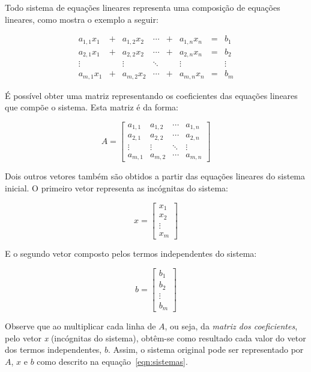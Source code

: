 \documentclass[a4paper,10pt]{report}
\begin{document}
Todo sistema de equações lineares representa uma composição de equações lineares, como mostra o exemplo a seguir:

\[
\begin{array}{cccccccc}
a_{1,1}x_{1} & + & a_{1,2}x_{2} & \cdots & + & a_{1,n}x_{n} & = & b_{1}\\
a_{2,1}x_{1} & + & a_{2,2}x_{2} & \cdots & + & a_{2,n}x_{n} & = & b_{2}\\
\vdots  & & \vdots  &  \ddots & & \vdots &  & \vdots  \\
a_{m,1}x_{1} & + & a_{m,2}x_{2} & \cdots & + & a_{m,n}x_{n} & = & b_{m}
\label{arr:sistema}
\end{array}
\]

É possível obter uma matriz representando os coeficientes das equações lineares que compõe o sistema. Esta matriz é da forma:

\[
A = \left[ \begin{array}{cccc}
a_{1,1} & a_{1,2} & \cdots & a_{1,n} \\
a_{2,1} & a_{2,2} & \cdots & a_{2,n} \\
\vdots  & \vdots & \ddots & \vdots \\
a_{m,1} & a_{m,2} & \cdots & a_{m,n}
\end{array}\right]
\]

Dois outros vetores também são obtidos a partir das equações lineares do sistema inicial. O primeiro vetor representa as incógnitas do sistema:

\[
x = \left[ \begin{array}{c}
x_{1} \\
x_{2} \\
\vdots \\
x_{m}
\label{arr:icognitas}
\end{array}\right]
\]

E o segundo vetor composto pelos termos independentes do sistema:

\[
b = \left[ \begin{array}{c}
b_{1} \\
b_{2} \\
\vdots \\
b_{m}
\label{arr:termos}
\end{array}\right]
\]

Observe que ao multiplicar cada linha de $A$, ou seja, da \textit{matriz dos coeficientes}, pelo vetor \textit{x} (incógnitas do sistema), obtêm-se como resultado cada valor do vetor dos termos independentes, $b$. Assim, o sistema original pode ser representado por $A$, $x$ e $b$ como descrito na equação~\ref{eqn:sistemas}.
\end{document}
